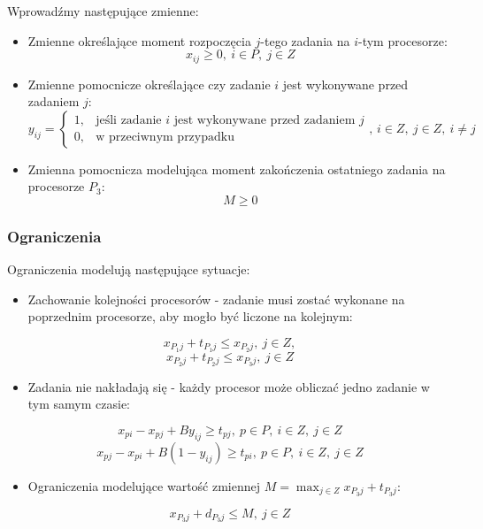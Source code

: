 \documentclass{article}
\begin{document}
    Wprowadźmy następujące zmienne:
    \begin{itemize}
        \item Zmienne określające moment rozpoczęcia $j$-tego zadania na $i$-tym procesorze:
            $$x_{ij} \geq 0, \ i \in P, \ j \in Z$$
        \item Zmienne pomocnicze określające czy zadanie $i$ jest wykonywane przed zadaniem $j$:
            \begin{equation*}
                y_{ij} =
                \begin{cases}
                    1, & \text{jeśli zadanie $i$ jest wykonywane przed zadaniem $j$} \\
                    0, & \text{w przeciwnym przypadku}
                \end{cases}
                \text{, $i \in Z,\ j \in Z,\ i \neq j$}
            \end{equation*}  
        \item Zmienna pomocnicza modelująca moment zakończenia ostatniego zadania na procesorze $P_3$:
            $$M \geq 0$$
    \end{itemize}
        
    \subsubsection{Ograniczenia}

        Ograniczenia modelują następujące sytuacje:
        \begin{itemize}
            \item Zachowanie kolejności procesorów - zadanie musi zostać wykonane na poprzednim procesorze, aby mogło być liczone na kolejnym:
        \end{itemize}
                $$x_{P_1j} + t_{P_1j} \leq x_{P_2j},\ j \in Z,$$
                $$x_{P_2j} + t_{P_2j} \leq x_{P_3j},\ j \in Z$$
        
        \begin{itemize}
            \item Zadania nie nakładają się - każdy procesor może obliczać jedno zadanie w tym samym czasie:
        \end{itemize}
                $$x_{pi} - x_{pj} + B y_{ij} \geq t_{pj},\ p \in P,\ i \in Z,\ j \in Z$$
                $$x_{pj} - x_{pi} + B (1 - y_{ij}) \geq t_{pi},\ p \in P,\ i \in Z,\ j \in Z$$
        
        \begin{itemize}
            \item Ograniczenia modelujące wartość zmiennej $M = \max_{j \in Z} x_{P_3j} + t_{P_3j}$:
        \end{itemize}
                $$x_{P_3j} + d_{P_3j} \leq M,\ j \in Z$$
\end{document}
